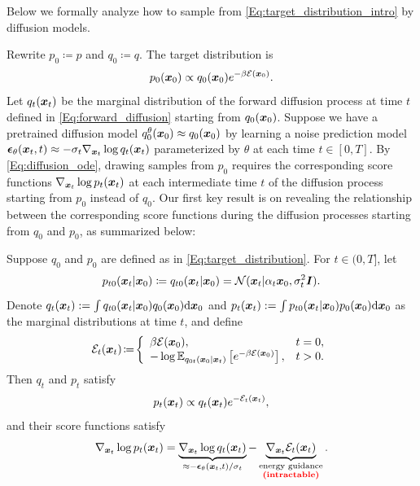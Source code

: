 Below we formally analyze how to sample from \eqref{Eq:target_distribution_intro} by diffusion models.

Rewrite $p_0 \coloneqq p$ and $q_0\coloneqq q$. The target distribution is
\begin{equation}
\label{Eq:target_distribution}
    p_0({\bm{x}}_0) \propto q_0({\bm{x}}_0)e^{-\beta{\mathcal{E}}({\bm{x}}_0)}.
\end{equation}
Let $q_t({\bm{x}}_t)$ be the marginal distribution of the forward diffusion process at time $t$ defined in \eqref{Eq:forward_diffusion} starting from $q_0({\bm{x}}_0)$. 
Suppose we have a pretrained diffusion model $q^{\theta}_0({\bm{x}}_0)\approx q_0({\bm{x}}_0)$ by learning a noise prediction model $\bm{\epsilon}_\theta({\bm{x}}_t,t)\approx -\sigma_t\nabla_{{\bm{x}}_t}\log q_t({\bm{x}}_t)$ parameterized by $\theta$ at each time $t\in[0,T]$. By \eqref{Eq:diffusion_ode}, drawing samples from $p_0$ requires the corresponding score functions $\nabla_{{\bm{x}}_t}\log p_t({\bm{x}}_t)$ at each intermediate time $t$ of the diffusion process starting from $p_0$ instead of $q_0$. 
Our first key result is on revealing the relationship between the corresponding score functions during the diffusion processes starting from $q_0$ and $p_0$, as summarized below:




\begin{theorem}
\label{thrm:intermediate_energy_guidance}
Suppose $q_0$ and $p_0$ are defined as in \eqref{Eq:target_distribution}. For $t\in(0, T]$, let
\begin{equation}
\label{Eq:forward_p}
    p_{t0}({\bm{x}}_t|{\bm{x}}_0) \coloneqq q_{t0}({\bm{x}}_t|{\bm{x}}_0) = {\mathcal{N}}({\bm{x}}_t|\alpha_t{\bm{x}}_0,\sigma_t^2{\bm{I}}).
\end{equation}
Denote $q_t({\bm{x}}_t):=\int q_{t0}({\bm{x}}_t|{\bm{x}}_0) q_0({\bm{x}}_0)\mathrm{d}{\bm{x}}_0$ and $p_t({\bm{x}}_t):=\int p_{t0}({\bm{x}}_t|{\bm{x}}_0) p_0({\bm{x}}_0)\mathrm{d}{\bm{x}}_0$ as the marginal distributions at time $t$, and define
\begin{equation}
\label{Eq:intermediate_energy}
    {\mathcal{E}}_t({\bm{x}}_t)\! \coloneqq\! \left\{
    \begin{array}{ll}
        \beta{\mathcal{E}}({\bm{x}}_0), & t=0, \\
        -\log \mathbb{E}_{q_{0t}({\bm{x}}_0|{\bm{x}}_t)}\left[
        e^{-\beta{\mathcal{E}}({\bm{x}}_0)}
        \right], & t > 0.
    \end{array} \right.
\end{equation}
Then $q_t$ and $p_t$ satisfy
\begin{equation}
    \label{Eq:pt_qt_Et}
    p_t({\bm{x}}_t) \propto q_t({\bm{x}}_t)e^{-{\mathcal{E}}_t({\bm{x}}_t)},
\end{equation}
and their score functions satisfy
\begin{equation}
\label{Eq:energy_guidance}
    \nabla_{{\bm{x}}_t}\log p_t({\bm{x}}_t) = \underbrace{\nabla_{{\bm{x}}_t}\log q_t({\bm{x}}_t)}_{\approx -\bm{\epsilon}_\theta({\bm{x}}_t,t)/\sigma_t}
    - \underbrace{\nabla_{{\bm{x}}_t}{\mathcal{E}}_t({\bm{x}}_t)}_{\substack{\text{energy guidance}\\\text{\color{red}{\textbf{(intractable)}}}}}.
\end{equation}
\vspace{-0.2in}
\end{theorem}






